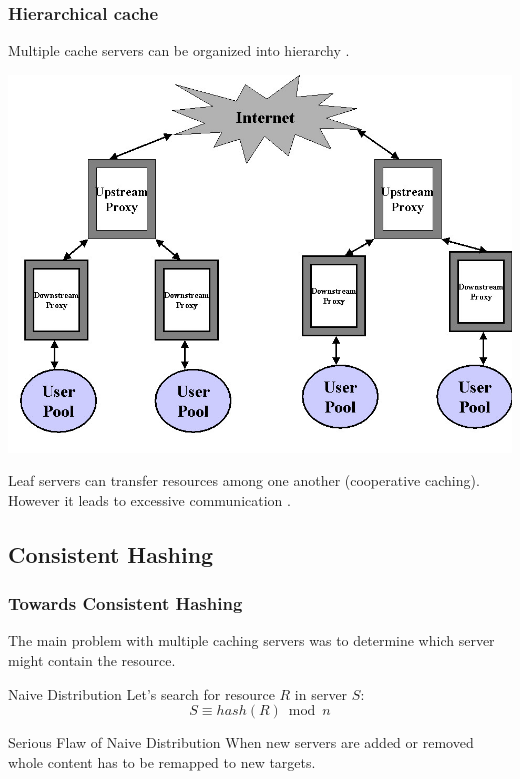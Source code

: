 \documentclass{beamer}
\begin{document}
\begin{frame}
\frametitle{Hierarchical cache}
\begin{block}{}
Multiple cache servers can be organized into hierarchy \cite{chankhunthod1995hierarchical}.
\end{block}
\begin{center}
\includegraphics[width=0.54\linewidth]{fig5.jpg}
\pause
\begin{block}{}
Leaf servers can transfer resources among one another (cooperative caching). 
However it leads to excessive communication \cite{povey1997distributed} \cite{wolman1999scale}.
\end{block}
\end{center}

\end{frame}

\subsection{Consistent Hashing}

\begin{frame}
\frametitle{Towards Consistent Hashing \cite{karger1997consistent}}
\begin{block}{}
The main problem with multiple caching servers was to determine which server
might contain the resource. 
\end{block}

\pause
\begin{block}{Naive Distribution}
Let's search for resource $R$ in server $S$: 
\begin{equation*}
S \equiv hash(R) \bmod n
\end{equation*}
\end{block}

\pause
\begin{block}{Serious Flaw of Naive Distribution}
When new servers are added or removed whole content has to be remapped to new targets.
\end{block}

\end{frame}
\end{document}
